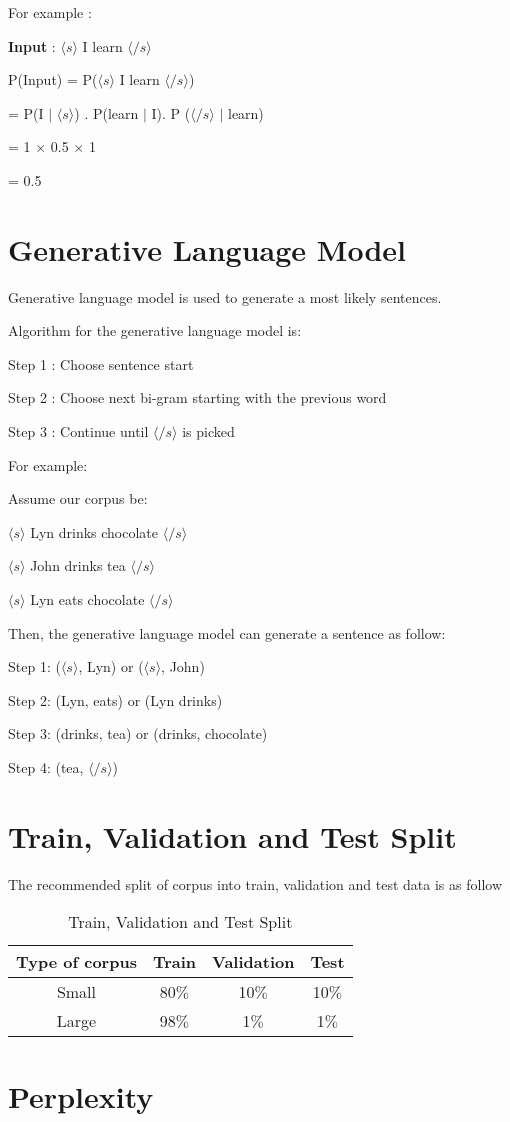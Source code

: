 For example :

\textbf{Input} : $\langle s \rangle$ I learn $\langle /s \rangle$

P(Input) = P($\langle s \rangle$ I learn $\langle /s \rangle$)

= P(I \(|\) $\langle s \rangle$) .  P(learn \(|\) I). P ($\langle /s \rangle$ \(|\) learn)

= 1 $\times$ 0.5 $\times$ 1

= 0.5

\section{Generative Language Model}
Generative language model is used to generate a most likely sentences.

Algorithm for the generative language model is:

Step 1 : Choose sentence start

Step 2 : Choose next bi-gram starting with the previous word

Step 3 : Continue until $\langle /s \rangle$ is picked

For example:

Assume our corpus be:

$\langle s \rangle$ Lyn drinks chocolate $\langle /s \rangle$

$\langle s \rangle$ John drinks tea $\langle /s \rangle$

$\langle s \rangle$ Lyn eats chocolate $\langle /s \rangle$

Then, the generative language model can generate a sentence as follow:

Step 1: \colorbox{green!30}{($\langle s \rangle$, Lyn)} or ($\langle s \rangle$, John)

Step 2: (Lyn, eats) or \colorbox{green!30}{(Lyn drinks)}

Step 3: \colorbox{green!30}{(drinks, tea)} or (drinks, chocolate)

Step 4: \colorbox{green!30}{(tea, $\langle /s \rangle$)}

\section{Train, Validation and Test Split}
The recommended split of corpus into train, validation and test data is as follow

\begin{table}[h]
	\centering
	\begin{tabular}{|c |c |c |c |}
		\hline
		Type of corpus & Train  & Validation & Test   \\
		\hline
		Small          & 80$\%$ & 10$\%$     & 10$\%$ \\
		\hline
		Large          & 98$\%$ & 1$\%$      & 1$\%$  \\
		\hline
	\end{tabular}
	\caption{Train, Validation and Test Split}
	\label{tab:TVT Split}
\end{table}

\section{Perplexity}





